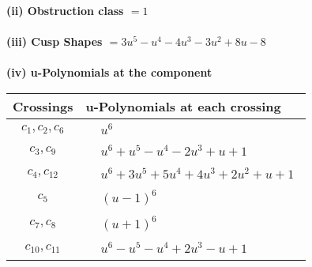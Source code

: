 \documentclass[1p]{elsarticle_modified}
\theoremstyle{definition}
\begin{document}
\flushleft \textbf{(ii) Obstruction class $= 1$}\\~\\
\flushleft \textbf{(iii) Cusp Shapes $= 3 u^5- u^4-4 u^3-3 u^2+8 u-8$}\\~\\
\newpage\renewcommand{\arraystretch}{1}
\flushleft \textbf{(iv) u-Polynomials at the component}\newline \\
\begin{tabular}{m{50pt}|m{274pt}}
Crossings & \hspace{64pt}u-Polynomials at each crossing \\
\hline $$\begin{aligned}c_{1},c_{2},c_{6}\end{aligned}$$&$\begin{aligned}
&u^6
\end{aligned}$\\
\hline $$\begin{aligned}c_{3},c_{9}\end{aligned}$$&$\begin{aligned}
&u^6+u^5- u^4-2 u^3+u+1
\end{aligned}$\\
\hline $$\begin{aligned}c_{4},c_{12}\end{aligned}$$&$\begin{aligned}
&u^6+3 u^5+5 u^4+4 u^3+2 u^2+u+1
\end{aligned}$\\
\hline $$\begin{aligned}c_{5}\end{aligned}$$&$\begin{aligned}
&(u-1)^6
\end{aligned}$\\
\hline $$\begin{aligned}c_{7},c_{8}\end{aligned}$$&$\begin{aligned}
&(u+1)^6
\end{aligned}$\\
\hline $$\begin{aligned}c_{10},c_{11}\end{aligned}$$&$\begin{aligned}
&u^6- u^5- u^4+2 u^3- u+1
\end{aligned}$\\
\hline
\end{tabular}\\~\\
\end{document}
